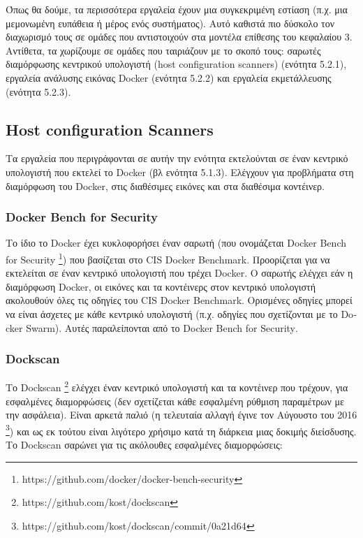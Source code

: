Όπως θα δούμε, τα περισσότερα εργαλεία έχουν μια συγκεκριμένη εστίαση (π.χ. μια
μεμονωμένη ευπάθεια ή μέρος ενός συστήματος). Αυτό καθιστά πιο δύσκολο τον
διαχωρισμό τους σε ομάδες που αντιστοιχούν στα μοντέλα επίθεσης του κεφαλαίου 3.
Αντίθετα, τα χωρίζουμε σε ομάδες που ταιριάζουν με το σκοπό τους: σαρωτές
διαμόρφωσης κεντρικού υπολογιστή (\textlatin{host configuration scanners})
(ενότητα 5.2.1), εργαλεία ανάλυσης εικόνας \textlatin{Docker} (ενότητα 5.2.2)
και εργαλεία εκμετάλλευσης (ενότητα 5.2.3).

\subsection{\textlatin{Host configuration Scanners}}

Τα εργαλεία που περιγράφονται σε αυτήν την ενότητα εκτελούνται σε έναν κεντρικό
υπολογιστή που εκτελεί το \textlatin{Docker} (βλ ενότητα 5.1.3). Ελέγχουν για
προβλήματα στη διαμόρφωση του \textlatin{Docker}, στις διαθέσιμες εικόνες και
στα διαθέσιμα κοντέινερ.

\subsubsection{\textlatin{Docker Bench for Security}}

Το ίδιο το \textlatin{Docker} έχει κυκλοφορήσει έναν σαρωτή (που ονομάζεται
\textlatin{Docker Bench for Security}
\footnote{\textlatin{https://github.com/docker/docker-bench-security}}) που
βασίζεται στο \textlatin{CIS Docker Benchmark}. Προορίζεται για να εκτελείται σε
έναν κεντρικό υπολογιστή που τρέχει \textlatin{Docker}. Ο σαρωτής ελέγχει εάν η
διαμόρφωση \textlatin{Docker}, οι εικόνες και τα κοντέινερς στον κεντρικό
υπολογιστή ακολουθούν όλες τις οδηγίες του \textlatin{CIS Docker Benchmark}.
Ορισμένες οδηγίες μπορεί να είναι άσχετες με κάθε κεντρικό υπολογιστή (π.χ.
οδηγίες που σχετίζονται με το \textlatin{Docker Swarm}). Αυτές παραλείπονται από
το \textlatin{Docker Bench for Security}.

\subsubsection{\textlatin{Dockscan}}

Το \textlatin{Dockscan} \footnote{\textlatin{https://github.com/kost/dockscan}}
ελέγχει έναν κεντρικό υπολογιστή και τα κοντέινερ που τρέχουν, για εσφαλμένες
διαμορφώσεις (δεν σχετίζεται κάθε εσφαλμένη ρύθμιση παραμέτρων με την ασφάλεια).
Είναι αρκετά παλιό (η τελευταία αλλαγή έγινε τον Αύγουστο του 2016
\footnote{\textlatin{https://github.com/kost/dockscan/commit/0a21d64}}) και ως
εκ τούτου είναι λιγότερο χρήσιμο κατά τη διάρκεια μιας δοκιμής διείσδυσης. Το
\textlatin{Dockscan} σαρώνει για τις ακόλουθες εσφαλμένες διαμορφώσεις:

